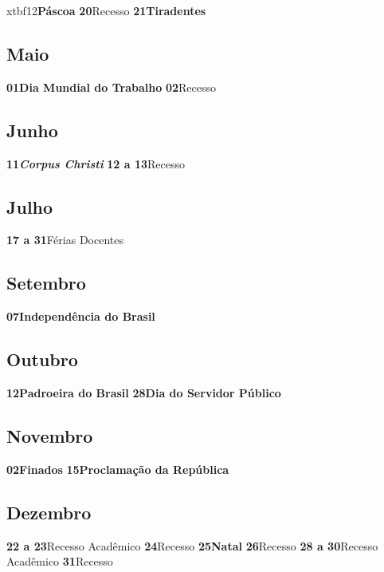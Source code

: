 \documentclass[thesis]{hmcposter}
\begin{document}
\begin{poster}
xtbf{12}\quad \quad \quad \quad \textbf{Páscoa} \newline\textbf{20}\quad \quad \quad \quad Recesso \newline\textbf{21}\quad \quad \quad \quad \textbf{Tiradentes} \newline\subsection{Maio}\textbf{01}\quad \quad \quad \quad \textbf{Dia Mundial do Trabalho} \newline\textbf{02}\quad \quad \quad \quad Recesso \newline\subsection{Junho}\textbf{11}\quad \quad \quad \quad \textbf{\textit{Corpus Christi}} \newline\textbf{12 a 13}\quad \quad Recesso \newline\subsection{Julho}\textbf{17 a 31}\quad \quad Férias Docentes \newline\subsection{Setembro}\textbf{07}\quad \quad \quad \quad \textbf{Independência do Brasil} \newline\subsection{Outubro}\textbf{12}\quad \quad \quad \quad \textbf{Padroeira do Brasil} \newline\textbf{28}\quad \quad \quad \quad \textbf{Dia do Servidor Público} \newline\subsection{Novembro}\textbf{02}\quad \quad \quad \quad \textbf{Finados} \newline\textbf{15}\quad \quad \quad \quad \textbf{Proclamação da República} \newline\subsection{Dezembro}\textbf{22 a 23}\quad \quad Recesso Acadêmico \newline\textbf{24}\quad \quad \quad \quad Recesso \newline\textbf{25}\quad \quad \quad \quad \textbf{Natal} \newline\textbf{26}\quad \quad \quad \quad Recesso \newline\textbf{28 a 30}\quad \quad Recesso Acadêmico \newline\textbf{31}\quad \quad \quad \quad Recesso \newline\newpage

\end{poster}
\end{document}
